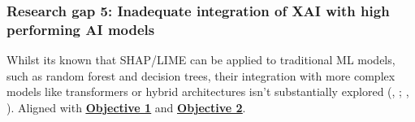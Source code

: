 
\subsubsection*{Research gap 5: Inadequate integration of XAI with high performing AI models}\label{research-gap-5}
Whilst its known that SHAP/LIME can be applied to traditional ML models, such as random forest and decision trees, their integration with more complex models like transformers or hybrid  architectures isn't substantially explored (\citeauthor{alzahrani2024explainable}, \citeyear{alzahrani2024explainable}; \citeauthor{lim2025explicate}, \citeyear{lim2025explicate}). Aligned with \hyperref[objective-1]{\uline{\textbf{Objective 1}}} and \hyperref[objective-2]{\uline{\textbf{Objective 2}}}.
